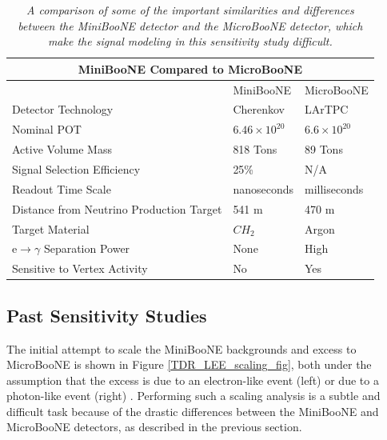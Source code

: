 \begin{table}
\begin{tabular}{ |p{5 cm}|p{3.5 cm}|p{3.5 cm}|  }
 \hline
 \multicolumn{3}{|c|}{MiniBooNE Compared to MicroBooNE} \\
 \hline
   & MiniBooNE & MicroBooNE \\
 \hline \hline
 Detector Technology & Cherenkov & LArTPC\\\hline
 Nominal POT & $6.46\times10^{20}$ & $6.6\times10^{20}$ \\\hline
 Active Volume Mass & 818 Tons & 89 Tons \\\hline
 Signal Selection Efficiency & 25\% & N/A \\\hline
 Readout Time Scale & nanoseconds & milliseconds \\\hline
 Distance from Neutrino Production Target & 541 m & 470 m \\\hline
 Target Material & $CH_2$ & Argon \\\hline
 e$\rightarrow\gamma$ Separation Power & None & High \\\hline
 Sensitive to Vertex Activity & No & Yes \\\hline
 \hline
\end{tabular}
\caption{\textit{A comparison of some of the important similarities and differences between the MiniBooNE detector and the MicroBooNE detector, which make the signal modeling in this sensitivity study difficult.}}\label{UB_MB_comparison_table}
\end{table}


\subsection{Past Sensitivity Studies}\label{georgia_scaling_description}

The initial attempt to scale the MiniBooNE backgrounds and excess to MicroBooNE is shown in Figure \ref{TDR_LEE_scaling_fig}, both under the assumption that the excess is due to an electron-like event (left) or due to a photon-like event (right) \cite{UBTDR}. Performing such a scaling analysis is a subtle and difficult task because of the drastic differences between the MiniBooNE and MicroBooNE detectors, as described in the previous section.\\

